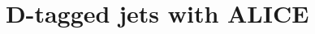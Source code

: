 \documentclass[12pt, a4paper, twoside, titlepage]{article}
\begin{document}

\section{D-tagged jets with ALICE}
\end{document}
